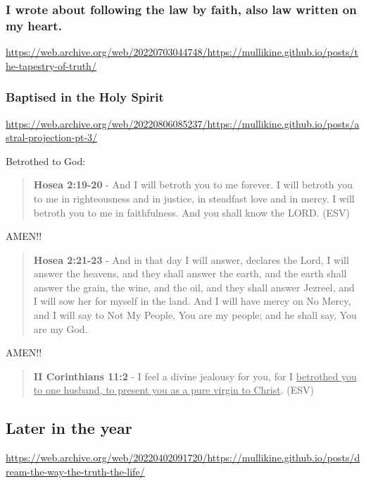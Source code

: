 \documentclass[11pt]{article}
\begin{document}
\subsubsection{I wrote about following the law by faith, also law written on my heart.}
\label{sec:org6765ce1}

\url{https://web.archive.org/web/20220703044748/https://mullikine.github.io/posts/the-tapestry-of-truth/}

\subsubsection{Baptised in the Holy Spirit}
\label{sec:org3e75895}
\url{https://web.archive.org/web/20220806085237/https://mullikine.github.io/posts/astral-projection-pt-3/}

Betrothed to God:

\begin{quote}
\textbf{Hosea 2:19-20} - And I will betroth you to me forever. I will betroth you to me in righteousness and in justice, in steadfast love and in mercy. I will betroth you to me in faithfulness. And you shall know the LORD. (ESV)
\end{quote}

AMEN!!

\begin{quote}
\textbf{Hosea 2:21-23} - And in that day I will answer, declares the Lord, I will answer the heavens, and they shall answer the earth, and the earth shall answer the grain, the wine, and the oil, and they shall answer Jezreel, and I will sow her for myself in the land. And I will have mercy on No Mercy, and I will say to Not My People, You are my people; and he shall say, You are my God.
\end{quote}

AMEN!!

\begin{quote}
\textbf{II Corinthians 11:2} - I feel a divine jealousy for you, for I \uline{betrothed you to one husband, to present you as a pure virgin to Christ}. (ESV)
\end{quote}

\subsection{Later in the year}
\label{sec:org2180910}
\url{https://web.archive.org/web/20220402091720/https://mullikine.github.io/posts/dream-the-way-the-truth-the-life/}
\end{document}
